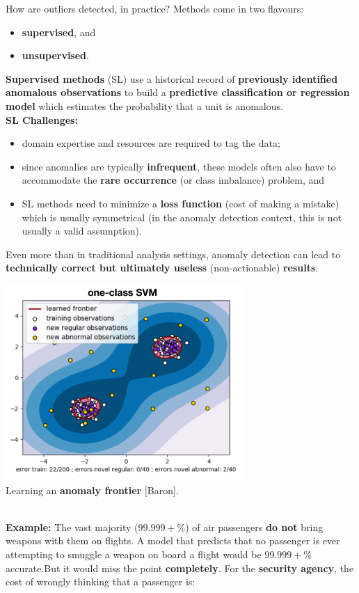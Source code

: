 \documentclass[20pt,landscape,footrule,headrule]{foils}
\newcommand{\newl}{\newline\newline}
\def\fh{\foilhead}
\begin{document}
\fh{Learning Framework} 
\noindent How are outliers detected, in practice? 
\newl Methods come in two flavours: 
\begin{itemize}
\item \textbf{supervised}, and 
\item \textbf{unsupervised}.\end{itemize}
\textbf{Supervised methods} (SL) use a historical record of \textbf{previously identified anomalous observations} to build a \textbf{predictive classification or regression model} which estimates the probability that a unit is anomalous.
\newpage\ \\ \noindent  \textbf{SL Challenges:} 
\begin{itemize}
\item domain expertise and resources are required to tag the data;
\item since anomalies are typically \textbf{infrequent}, these models often also have to accommodate the \textbf{rare occurrence} (or class imbalance) problem, and 
\item SL methods need to minimize a \textbf{loss function} (cost of making a mistake) which is usually symmetrical (in the anomaly detection context, this  is not usually a valid assumption). 
\end{itemize}
Even more than in traditional analysis settings, anomaly detection can lead to \textbf{technically correct but ultimately useless} (non-actionable) \textbf{results}. 
\newpage
\begin{center}
\includegraphics[width=0.68\textwidth]{Images/1SVM.png} \\ 
Learning an \textbf{anomaly frontier} [Baron].
\end{center}
\newpage\ \\ \noindent  \textbf{Example:} The vast majority ($99.999+$\%) of air passengers \textbf{do not} bring weapons with them on flights. \newl A model that predicts that no passenger is ever attempting to smuggle a weapon on board a flight would be $99.999+$\% accurate.\newl But it would miss the point \textbf{completely}. For the \textbf{security agency}, the cost of wrongly thinking that a passenger is:
\end{document}
